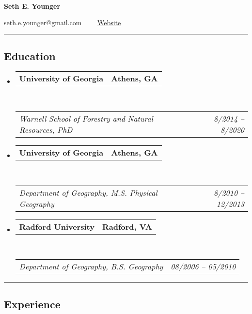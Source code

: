 \documentclass[10pt,letterpaper]{article}
\makeatletter
\newcommand{\headerrow}[2]
{\begin{tabular*}{\linewidth}{l@{\extracolsep{\fill}}r}
	#1 &
	#2 \\
\end{tabular*}}
\makeatother
\begin{document}
	

\begin{center}
{\LARGE \textbf{Seth E. Younger}}

seth.e.younger@gmail.com\ \ \textbullet
\ \ \href{http://www.sethyounger.com}{Website}
\end{center}

\hrule
\vspace{-0.4em}
\subsection*{Education}

\begin{itemize}
	\parskip=0.1em
	
	\item 
	\headerrow
	{\textbf{University of Georgia}}
	{\textbf{Athens, GA}}
	\\
	\headerrow
	{\emph{Warnell School of Forestry and Natural Resources, PhD}}
	{\emph{8/2014 -- 8/2020}}
	
	\item 
	\headerrow
	{\textbf{University of Georgia}}
	{\textbf{Athens, GA}}
	\\
	\headerrow
	{\emph{Department of Geography, M.S. Physical Geography}}
	{\emph{8/2010 -- 12/2013}}
	
	\item 
	\headerrow
	{\textbf{Radford University}}
	{\textbf{Radford, VA}}
	\\
	\headerrow
	{\emph{Department of Geography, B.S. Geography}}
	{\emph{08/2006 -- 05/2010}}
	
\end{itemize}

\hrule
\vspace{-0.4em}
\subsection*{Experience}
\end{document}

